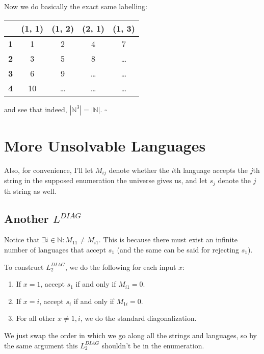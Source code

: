 \documentclass[12pt]{article}
\newcommand{\N}{\mathbb{N}}
\begin{document}
Now we do basically the exact same labelling:
\begin{center}
    \begin{tabular}{c|cccc}
                   & \textbf{(1, 1)} & \textbf{(1, 2)} & \textbf{(2, 1)} & \textbf{(1, 3)} \\ \hline
        \textbf{1} & 1               & 2               & 4               & 7               \\
        \textbf{2} & 3               & 5               & 8               & \ldots          \\
        \textbf{3} & 6               & 9               & \ldots          & \ldots          \\
        \textbf{4} & 10              & \ldots          & \ldots          & \ldots          \\
    \end{tabular}
\end{center}
and see that indeed, $\left|\N^3\right|=|\N|$. $\square$

\pagebreak

\section{More Unsolvable Languages}

Also, for convenience, I'll let $M_{ij}$ denote whether the $i$th language accepts
the $j$th string in the supposed enumeration the universe gives us,
and let $s_j$ denote the $j$th string as well.

\subsection{Another \texorpdfstring{$L^{DIAG}$}{L\^DIAG}}\label{sec:onemore}

Notice that $\exists i \in \N: M_{11} \ne M_{i1}$.
This is because there must exist an infinite number
of languages that accept $s_1$ (and the same can be said for rejecting $s_1$).

To construct $L_2^{DIAG}$, we do the following for each input $x$:
\begin{enumerate}[nolistsep]
    \item If $x=1$, accept $s_1$ if and only if $M_{i1}=0$.
    \item If $x=i$, accept $s_i$ if and only if $M_{1i}=0$.
    \item For all other $x \ne 1, i$, we do the standard diagonalization.
\end{enumerate}
We just swap the order in which we go along all the strings and languages,
so by the same argument this $L_2^{DIAG}$ shouldn't be in the enumeration.
\end{document}
